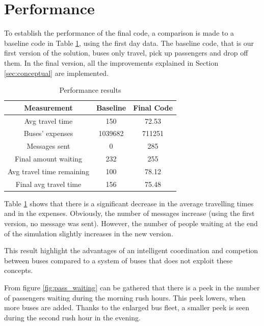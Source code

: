 \section{Performance}
To establish the performance of the final code, a comparison is made to a baseline code in Table \ref{table:table1}, using the first day data. The baseline code, that is our first version of the solution, buses only travel, pick up passengers and drop off them. In the final version, all the improvements explained in Section \ref{sec:conceptual} are implemented.

\begin{table}[htbp]
\centering
\begin{tabular}{ |c|c|c|  }
 \hline
  Measurement & Baseline & Final Code \\
 \hline
  Avg travel time & 150 & 72.53 \\
  Buses' expenses & 1039682 & 711251 \\
  Messages sent & 0 & 285  \\
  Final amount waiting & 232 & 255 \\
  Avg travel time remaining & 100 & 78.12 \\
  Final avg travel time & 156 & 75.48 \\
 \hline
\end{tabular}
\label{table:table1}
\caption{Performance results}
\end{table}

Table \ref{table:table1} shows that there is a significant decrease in the average travelling times and in the expenses. Obviously, the number of messages increase (using the first version, no message was sent). However, the number of people waiting at the end of the simulation slightly increases in the new version.

This result highlight the advantages of an intelligent coordination and competion between buses compared to a system of buses that does not exploit these concepts.

From figure \ref{fig:pass_waiting} can be gathered that there is a peek in the number of passengers waiting during the morning rush hours. This peek lowers, when more buses are added. Thanks to the enlarged bus fleet, a smaller peek is seen during the second rush hour in the evening.


